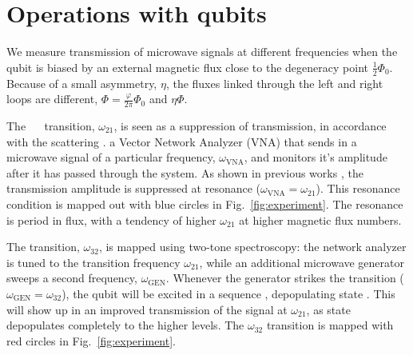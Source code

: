 \section{Operations with qubits}
\label{sec:characterisation}



\noindent We measure transmission of microwave signals at different frequencies when the qubit
is  biased by  an  external magnetic  flux  close  to the  degeneracy  point $  \frac{1}{2}\Phi_0
$. Because of a  small asymmetry, $\eta$, the fluxes linked through the  left and right loops are
different, $ \Phi = \frac{\varphi}{2\pi}\Phi_0$ and $ \eta\Phi $.

The ~\ilra~ transition, $\omega_{21}$, is seen as a suppression of transmission, in
accordance  with the  scattering \cite{Astafiev2010}.   a Vector  Network Analyzer  (VNA) that
sends in  a microwave signal  of a particular  frequency, $\omega_{\text{VNA}}$, and  monitors it's
amplitude  after   it  has   passed  through   the  system.   As   shown  in   previous  works
\cite{abdumalikov2010},   the    transmission   amplitude    is   suppressed    at   resonance
($\omega_{\text{VNA}}=\omega_{21}$).   This resonance  condition  is  mapped out  with  blue circles  in
Fig.~\ref{fig:experiment}.   The resonance  is  period  in flux,  with  a  tendency of  higher
$\omega_{21}$  at  higher  magnetic  flux numbers.   

The \ilra{}  transition, $\omega_{32}$,  is mapped  using two-tone  spectroscopy: the
network  analyzer is  tuned  to the  transition  frequency  $ \omega_{21}  $,  while an  additional
microwave generator  sweeps a  second frequency,  $ \omega_{\text{GEN}}  $. Whenever  the generator
strikes the  \ira{} transition ($\omega_{\text{GEN}} =  \omega_{32} $), the qubit  will be
excited  in  a  sequence         ,
depopulating state .  This  will show up in an improved transmission  of the signal at
$\omega_{21}$,   as  state      depopulates   completely  to   the   higher  levels.    The
$\omega_{32}$ transition is mapped with red circles in Fig.~\ref{fig:experiment}. 

